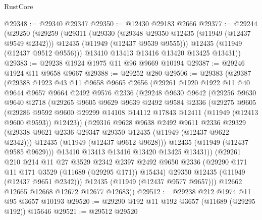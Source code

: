 \begin{lexlean}{RustCore}
\begin{coremodule}
@29348 := @29340 @29347
@29350 := @12430 @29183 @2666
@29377 := @29244
    (@29250
      (@29259
        (@29311
          (@29330
            (@29348 @29350 @12435 (@11949 (@12437 @9549 @2342)))
            @12435
            (@11949 (@12437 @9539 @9555)))
          @12435
          (@11949 (@12437 @9512 @9556)))
        @13410
        @13413
        @13416
        @13420
        @13425
        @13431))
@29383 := @29238 @1924 @1975 @11 @96 @9669 @10194
@29387 := @29246 @1924 @11 @9658 @9667
@29388 := @29252 @280
@29506 := @29383
    (@29387
      (@29388
        @1923
        @43
        @11
        @9658
        @9665
        @2656
        (@29261
          @1920
          @1922
          @11
          @40
          @9644
          @9657
          @9664
          @2492
          @9576
          @2336
          (@29248
            @9630
            @9642
            (@29256
              @9630
              @9640
              @2718
              (@29265
                @9605
                @9629
                @9639
                @2492
                @9584
                @2336
                (@29275
                  @9605
                  (@29286
                    @9592
                    @9600
                    @29299
                    @14108
                    @14112
                    @17843
                    @12411
                    (@11949 (@12413 @9600 @9593))
                    @12423))
                (@29316
                  @9628
                  @9638
                  @2492
                  @9611
                  @2336
                  @29329
                  (@29338 @9621 @2336 @29347 @29350 @12435 (@11949 (@12437 @9622 @2342)))
                  @12435
                  (@11949 (@12437 @9612 @9628)))
                @12435
                (@11949 (@12437 @9585 @9629)))
              @13410
              @13413
              @13416
              @13420
              @13425
              @13431))
          (@29261
            @210
            @214
            @11
            @27
            @3529
            @2342
            @2397
            @2492
            @9650
            @2336
            (@29290 @171 @11 @171 @3529 (@11689 (@29295 @171)) @15434)
            @29350
            @12435
            (@11949 (@12437 @9651 @2342)))
          @12435
          (@11949 (@12437 @9577 @9657)))
        @12662
        @12665
        @12668
        @12672
        @12677
        @12683))
@29512 := @29238 @212 @1974 @11 @95 @3657 @10193
@29520 := @29290 @192 @11 @192 @3657 (@11689 (@29295 @192)) @15646
@29521 := @29512 @29520

\end{coremodule}
\end{lexlean}
